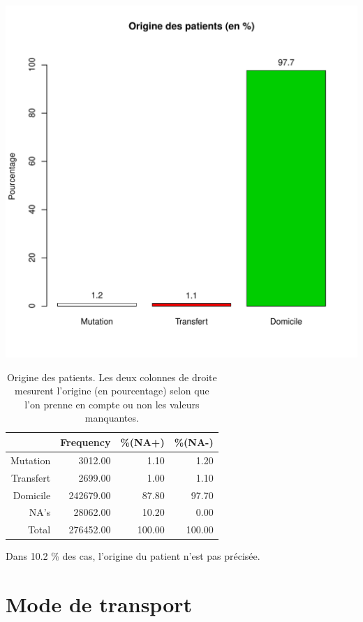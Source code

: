 \documentclass[12pt,english,french,twoside]{report}\usepackage[]{graphicx}\usepackage[]{color}
\makeatletter
\def\maxwidth{ %
  \ifdim\Gin@nat@width>\linewidth
    \linewidth
  \else
    \Gin@nat@width
  \fi
}
\makeatother
\begin{document}
\includegraphics[width=\maxwidth]{figure/mode_entree} 
\begin{table}[ht]
\centering
\begin{tabular}{rrrr}
  \hline
 & Frequency &   \%(NA+) &   \%(NA-) \\ 
  \hline
Mutation & 3012.00 & 1.10 & 1.20 \\ 
  Transfert & 2699.00 & 1.00 & 1.10 \\ 
  Domicile & 242679.00 & 87.80 & 97.70 \\ 
  NA's & 28062.00 & 10.20 & 0.00 \\ 
    Total & 276452.00 & 100.00 & 100.00 \\ 
   \hline
\end{tabular}
\caption[Origine des patients]{Origine des patients. Les deux colonnes de droite mesurent l'origine (en pourcentage) selon que l'on prenne en compte ou non les valeurs manquantes. } 
\label{origine}
\end{table}



Dans 10.2 \% des cas, l'origine du patient n'est pas précisée.

\section*{Mode de transport}
\end{document}
